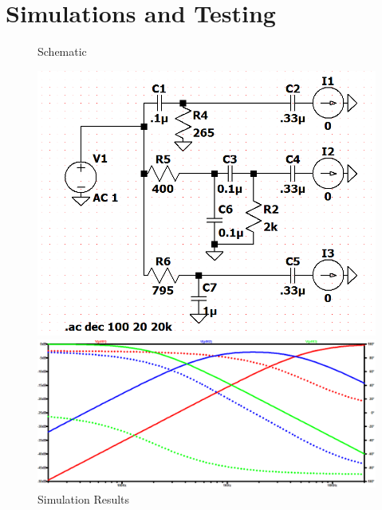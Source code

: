 \documentclass{article}
\begin{document}
\section*{Simulations and Testing}
\begin{figure}[!h]
\centering
\caption{Schematic}
\includegraphics[scale=.5]{lab6_spice_schematic}
\caption{Simulation Results}
\includegraphics[width=\linewidth]{lab6_spice_graph}
\end{figure}
\end{document}
